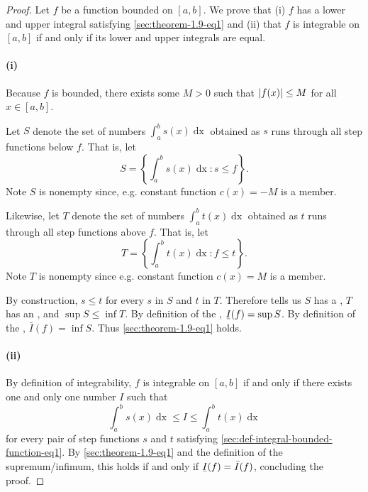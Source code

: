 \documentclass{report}
\newcommand{\ubar}[1]{\text{\b{$#1$}}}
\begin{document}
\begin{proof}

  Let $f$ be a function bounded on $[a, b]$.
  We prove that (i) $f$ has a lower and upper integral satisfying
    \eqref{sec:theorem-1.9-eq1} and (ii) that $f$ is integrable on $[a, b]$ if
    and only if its lower and upper integrals are equal.

  \paragraph{(i)}%

    Because $f$ is bounded, there exists some $M > 0$ such that
      $\left|f(x)\right| \leq M$ for all $x \in [a, b]$.

    Let $S$ denote the set of numbers $\int_a^b s(x) \mathop{dx}$ obtained as
      $s$ runs through all step functions below $f$.
    That is, let $$S = \left\{ \int_a^b s(x) \mathop{dx} : s \leq f \right\}.$$
    Note $S$ is nonempty since, e.g. constant function $c(x) = -M$ is a member.

    Likewise, let $T$ denote the set of numbers $\int_a^b t(x) \mathop{dx}$
      obtained as $t$ runs through all step functions above $f$.
    That is, let $$T = \left\{ \int_a^b t(x) \mathop{dx} : f \leq t \right\}.$$
    Note $T$ is nonempty since e.g. constant function $c(x) = M$ is a member.

    By construction, $s \leq t$ for every $s$ in $S$ and $t$ in $T$.
    Therefore  tells us $S$ has a
      , $T$ has an , and
      $\sup{S} \leq \inf{T}$.
    By definition of the ,
      $\ubar{I}(f) = \sup{S}$.
    By definition of the ,
      $\bar{I}(f) = \inf{S}$.
    Thus \eqref{sec:theorem-1.9-eq1} holds.

  \paragraph{(ii)}%

    By definition of integrability, $f$ is integrable on $[a, b]$ if and only if
      there exists one and only one number $I$ such that
      $$\int_a^b s(x) \mathop{dx} \leq I \leq \int_a^b t(x) \mathop{dx}$$
      for every pair of step functions $s$ and $t$ satisfying
      \eqref{sec:def-integral-bounded-function-eq1}.
    By \eqref{sec:theorem-1.9-eq1} and the definition of the supremum/infimum,
      this holds if and only if $\ubar{I}(f) = \bar{I}(f)$, concluding the
      proof.

\end{proof}
\end{document}
